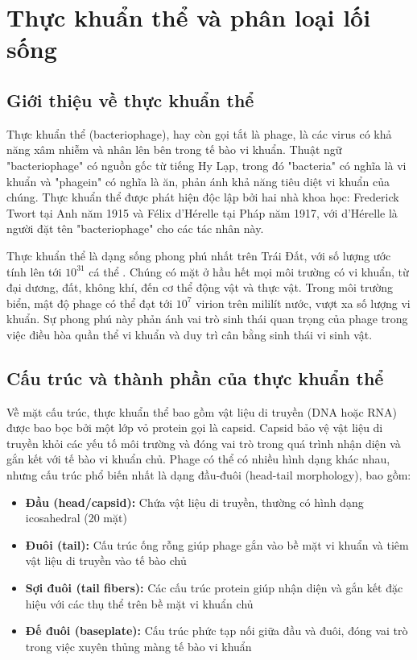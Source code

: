 \section{Thực khuẩn thể và phân loại lối sống}
\label{sec:bacteriophage}

\subsection{Giới thiệu về thực khuẩn thể}

Thực khuẩn thể (bacteriophage), hay còn gọi tắt là phage, là các virus có khả năng xâm nhiễm và nhân lên bên trong tế bào vi khuẩn. Thuật ngữ "bacteriophage" có nguồn gốc từ tiếng Hy Lạp, trong đó "bacteria" có nghĩa là vi khuẩn và "phagein" có nghĩa là ăn, phản ánh khả năng tiêu diệt vi khuẩn của chúng. Thực khuẩn thể được phát hiện độc lập bởi hai nhà khoa học: Frederick Twort tại Anh năm 1915 và Félix d'Hérelle tại Pháp năm 1917, với d'Hérelle là người đặt tên "bacteriophage" cho các tác nhân này.

Thực khuẩn thể là dạng sống phong phú nhất trên Trái Đất, với số lượng ước tính lên tới $10^{31}$ cá thể \cite{suttle2007marine}. Chúng có mặt ở hầu hết mọi môi trường có vi khuẩn, từ đại dương, đất, không khí, đến cơ thể động vật và thực vật. Trong môi trường biển, mật độ phage có thể đạt tới $10^7$ virion trên mililít nước, vượt xa số lượng vi khuẩn. Sự phong phú này phản ánh vai trò sinh thái quan trọng của phage trong việc điều hòa quần thể vi khuẩn và duy trì cân bằng sinh thái vi sinh vật.

\subsection{Cấu trúc và thành phần của thực khuẩn thể}

Về mặt cấu trúc, thực khuẩn thể bao gồm vật liệu di truyền (DNA hoặc RNA) được bao bọc bởi một lớp vỏ protein gọi là capsid. Capsid bảo vệ vật liệu di truyền khỏi các yếu tố môi trường và đóng vai trò trong quá trình nhận diện và gắn kết với tế bào vi khuẩn chủ. Phage có thể có nhiều hình dạng khác nhau, nhưng cấu trúc phổ biến nhất là dạng đầu-đuôi (head-tail morphology), bao gồm:

\begin{itemize}
    \item \textbf{Đầu (head/capsid):} Chứa vật liệu di truyền, thường có hình dạng icosahedral (20 mặt)
    \item \textbf{Đuôi (tail):} Cấu trúc ống rỗng giúp phage gắn vào bề mặt vi khuẩn và tiêm vật liệu di truyền vào tế bào chủ
    \item \textbf{Sợi đuôi (tail fibers):} Các cấu trúc protein giúp nhận diện và gắn kết đặc hiệu với các thụ thể trên bề mặt vi khuẩn chủ
    \item \textbf{Đế đuôi (baseplate):} Cấu trúc phức tạp nối giữa đầu và đuôi, đóng vai trò trong việc xuyên thủng màng tế bào vi khuẩn
\end{itemize}

